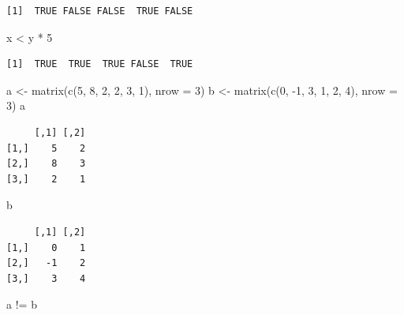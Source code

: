 \documentclass[
]{book}
\newenvironment{Shaded}{\begin{snugshade}}{\end{snugshade}}
\newcommand{\AttributeTok}[1]{\textcolor[rgb]{0.77,0.63,0.00}{#1}}
\newcommand{\DecValTok}[1]{\textcolor[rgb]{0.00,0.00,0.81}{#1}}
\newcommand{\FunctionTok}[1]{\textcolor[rgb]{0.00,0.00,0.00}{#1}}
\newcommand{\NormalTok}[1]{#1}
\newcommand{\OtherTok}[1]{\textcolor[rgb]{0.56,0.35,0.01}{#1}}
\newcommand{\SpecialCharTok}[1]{\textcolor[rgb]{0.00,0.00,0.00}{#1}}
\begin{document}
\begin{verbatim}
[1]  TRUE FALSE FALSE  TRUE FALSE
\end{verbatim}

\begin{Shaded}
\begin{Highlighting}[]
\NormalTok{x }\SpecialCharTok{\textless{}}\NormalTok{ y }\SpecialCharTok{*} \DecValTok{5}
\end{Highlighting}
\end{Shaded}

\begin{verbatim}
[1]  TRUE  TRUE  TRUE FALSE  TRUE
\end{verbatim}

\begin{Shaded}
\begin{Highlighting}[]
\NormalTok{a }\OtherTok{\textless{}{-}} \FunctionTok{matrix}\NormalTok{(}\FunctionTok{c}\NormalTok{(}\DecValTok{5}\NormalTok{, }\DecValTok{8}\NormalTok{, }\DecValTok{2}\NormalTok{, }\DecValTok{2}\NormalTok{, }\DecValTok{3}\NormalTok{, }\DecValTok{1}\NormalTok{), }\AttributeTok{nrow =} \DecValTok{3}\NormalTok{)}
\NormalTok{b }\OtherTok{\textless{}{-}} \FunctionTok{matrix}\NormalTok{(}\FunctionTok{c}\NormalTok{(}\DecValTok{0}\NormalTok{, }\SpecialCharTok{{-}}\DecValTok{1}\NormalTok{, }\DecValTok{3}\NormalTok{, }\DecValTok{1}\NormalTok{, }\DecValTok{2}\NormalTok{, }\DecValTok{4}\NormalTok{), }\AttributeTok{nrow =} \DecValTok{3}\NormalTok{)}
\NormalTok{a}
\end{Highlighting}
\end{Shaded}

\begin{verbatim}
     [,1] [,2]
[1,]    5    2
[2,]    8    3
[3,]    2    1
\end{verbatim}

\begin{Shaded}
\begin{Highlighting}[]
\NormalTok{b}
\end{Highlighting}
\end{Shaded}

\begin{verbatim}
     [,1] [,2]
[1,]    0    1
[2,]   -1    2
[3,]    3    4
\end{verbatim}

\begin{Shaded}
\begin{Highlighting}[]
\NormalTok{a }\SpecialCharTok{!=}\NormalTok{ b}
\end{Highlighting}
\end{Shaded}
\end{document}
